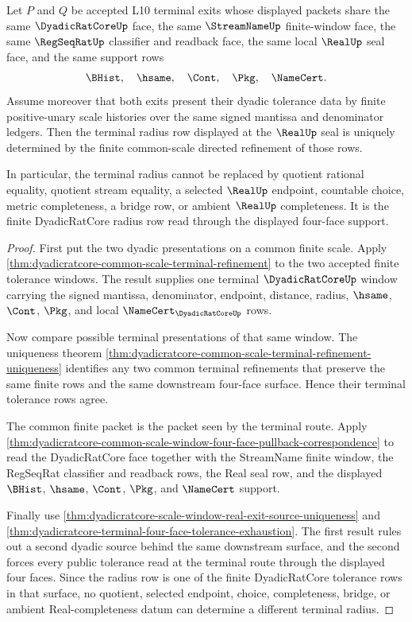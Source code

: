 \begin{theorem}
\label{thm:dyadicratcore-terminal-radius-choice-free}
Let $P$ and $Q$ be accepted L10 terminal exits whose displayed packets share the same $\DyadicRatCoreUp$ face, the same $\StreamNameUp$ finite-window face, the same $\RegSeqRatUp$ classifier and readback face, the same local $\RealUp$ seal face, and the same support rows
$$
\BHist,\quad \hsame,\quad \Cont,\quad \Pkg,\quad \NameCert .
$$
Assume moreover that both exits present their dyadic tolerance data by finite positive-unary scale histories over the same signed mantissa and denominator ledgers. Then the terminal radius row displayed at the $\RealUp$ seal is uniquely determined by the finite common-scale directed refinement of those rows.

In particular, the terminal radius cannot be replaced by quotient rational equality, quotient stream equality, a selected $\RealUp$ endpoint, countable choice, metric completeness, a bridge row, or ambient $\RealUp$ completeness. It is the finite DyadicRatCore radius row read through the displayed four-face support.
\end{theorem}
\begin{proof}
First put the two dyadic presentations on a common finite scale. Apply \autoref{thm:dyadicratcore-common-scale-terminal-refinement} to the two accepted finite tolerance windows. The result supplies one terminal $\DyadicRatCoreUp$ window carrying the signed mantissa, denominator, endpoint, distance, radius, $\hsame$, $\Cont$, $\Pkg$, and local $\NameCert_{\DyadicRatCoreUp}$ rows.

Now compare possible terminal presentations of that same window. The uniqueness theorem \autoref{thm:dyadicratcore-common-scale-terminal-refinement-uniqueness} identifies any two common terminal refinements that preserve the same finite rows and the same downstream four-face surface. Hence their terminal tolerance rows agree.

The common finite packet is the packet seen by the terminal route. Apply \autoref{thm:dyadicratcore-common-scale-window-four-face-pullback-correspondence} to read the DyadicRatCore face together with the StreamName finite window, the RegSeqRat classifier and readback rows, the Real seal row, and the displayed $\BHist$, $\hsame$, $\Cont$, $\Pkg$, and $\NameCert$ support.

Finally use \autoref{thm:dyadicratcore-scale-window-real-exit-source-uniqueness} and \autoref{thm:dyadicratcore-terminal-four-face-tolerance-exhaustion}. The first result rules out a second dyadic source behind the same downstream surface, and the second forces every public tolerance read at the terminal route through the displayed four faces. Since the radius row is one of the finite DyadicRatCore tolerance rows in that surface, no quotient, selected endpoint, choice, completeness, bridge, or ambient Real-completeness datum can determine a different terminal radius.
\end{proof}

